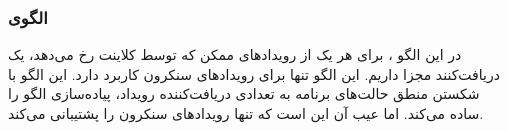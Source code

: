 \subsubsection{الگوی }
\label{smMultipleEvRecSec}
\begin{RTL}
در این الگو \cite{ref1}،
برای هر یک از رویدادهای ممکن که توسط کلاینت رخ می‌دهد، یک
دریافت‌کنند مجزا داریم. این الگو تنها برای رویدادهای سنکرون کاربرد دارد.
این الگو با شکستن منطق حالت‌های برنامه به تعدادی دریافت‌کننده رویداد، پیاده‌سازی
الگو را ساده می‌کند. اما عیب آن این است که تنها رویدادهای سنکرون را پشتیبانی
می‌کند.
\end{RTL}